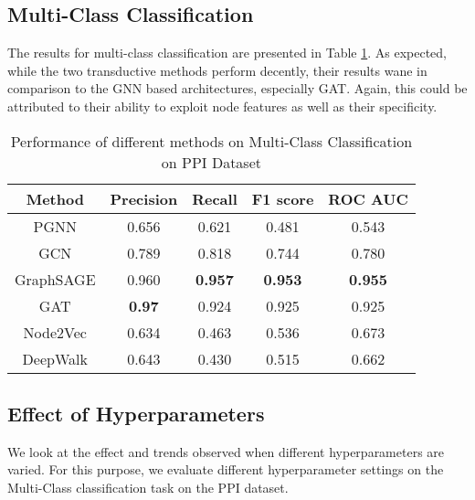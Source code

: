 \documentclass[sigconf]{acmart}
\begin{document}
\subsection{Multi-Class Classification}
The results for multi-class classification are presented in Table \ref{tab:multiclass_classification_ppi}. As expected, while the two transductive methods perform decently, their results wane in comparison to the GNN based architectures, especially GAT. Again, this could be attributed to their ability to exploit node features as well as their specificity.
\begin{table}[H]
    \centering
    \begin{tabular}{|c|c|c|c|c|}
    \hline
        \textbf{Method} & \textbf{Precision} & \textbf{Recall} & \textbf{F1 score} & \textbf{ROC AUC} \\
        \hline
        PGNN	&	0.656&	0.621&	0.481&	0.543\\
        GCN	&	0.789&0.818&0.744&0.780\\
GraphSAGE	&	0.960	&\textbf{0.957}	&\textbf{0.953}&	\textbf{0.955}\\
GAT	&	\textbf{0.97}&	0.924&	0.925&	0.925\\
        \hline
         Node2Vec & 0.634 & 0.463 & 0.536 & 0.673\\
         DeepWalk & 0.643 & 0.430 & 0.515 & 0.662\\
         \hline
    \end{tabular}
    \caption{Performance of different methods on Multi-Class Classification on PPI Dataset}
    \label{tab:multiclass_classification_ppi}
\end{table}

\subsection{Effect of Hyperparameters}
We look at the effect and trends observed when different hyperparameters are varied. For this purpose, we evaluate different hyperparameter settings on the Multi-Class classification task on the PPI dataset.
\end{document}
